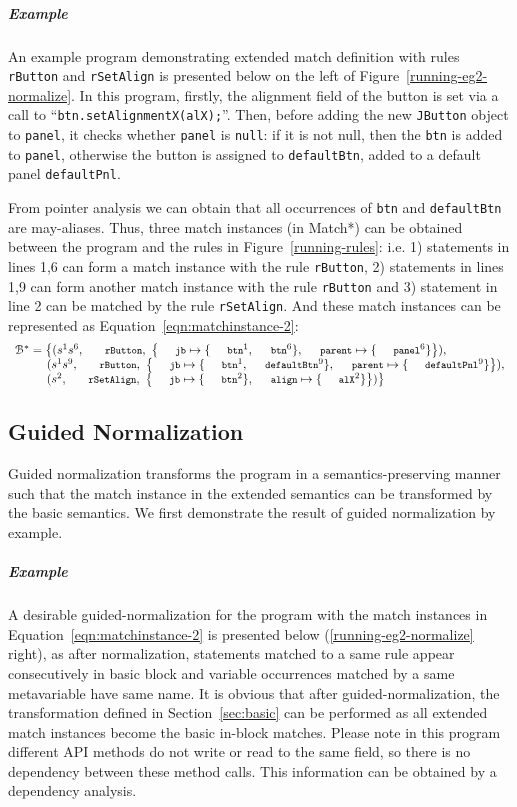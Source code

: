 \documentclass[a4paper, USenglish]{lipics-v2016}
\newcommand{\code}[1]{\texttt{\footnotesize #1}}
\theoremstyle{plain}
\begin{document}
\subparagraph*{Example} An example program demonstrating extended match
definition with rules \code{rButton} and \code{rSetAlign} is presented below on the left of Figure~\ref{running-eg2-normalize}. In this program, firstly, the alignment field of the button is set via a call to ``\code{btn.setAlignmentX(alX);}''. Then, before adding the new \code{JButton} object to \code{panel}, it  checks whether \code{panel} is \code{null}: if it is not {null}, then the \code{btn} is added to \code{panel}, otherwise the button is assigned to \code{defaultBtn}, added to a default panel \code{defaultPnl}. 

From pointer analysis we can obtain that all occurrences of \code{btn}
and \code{defaultBtn}
are may-aliases.
Thus, three match instances (in Match*) can be obtained between the program and the rules in Figure~\ref{running-rules}: i.e. 1) statements in lines 1,6 can form a match instance with the rule \code{rButton}, 2) statements in lines 1,9 can form another match instance with the rule \code{rButton} and 3) statement in line 2 can be matched by the rule \code{rSetAlign}. And these match instances can be represented as Equation~\ref{eqn:matchinstance-2}:
\begin{equation}
\label{eqn:matchinstance-2}
\begin{array}{l}
  \mathcal{B}^*=\big\{(s^1s^6,~\code{rButton},~\left\{\code{jb}\mapsto\{\code{btn}^1, \code{btn}^6\}, \code{parent}\mapsto\{\code{panel}^6\}\right\}),\\
  \quad\quad~~(s^1s^9,~\code{rButton},~\left\{\code{jb}\mapsto\{\code{btn}^1, \code{defaultBtn}^9\}, \code{parent}\mapsto\{\code{defaultPnl}^9\}\right\}),\\
  \quad\quad~~(s^2,~\code{rSetAlign},~\left\{\code{jb}\mapsto\{\code{btn}^2\}, \code{align}\mapsto\{\code{alX}^2\}\right\})\big\}
\end{array}
\end{equation}

\subsection{Guided Normalization}

Guided normalization transforms the program in a
semantics-preserving manner such that the match instance in the
extended semantics can be transformed by the basic semantics. We first
demonstrate the result of guided normalization by example.

\subparagraph*{Example} A desirable guided-normalization for the program with the match instances in
Equation~\ref{eqn:matchinstance-2} is presented below (\ref{running-eg2-normalize} right), as after
normalization, statements matched to a same rule appear consecutively
in basic block and variable occurrences matched by a same metavariable
have same name. It is obvious that after guided-normalization, the
transformation defined in Section~\ref{sec:basic} can be performed as
all extended match instances become the basic in-block matches.
Please note in this program different API methods do not write or read
to the same field, so there is no dependency between these method
calls. This information can be obtained by a dependency analysis.
\end{document}
